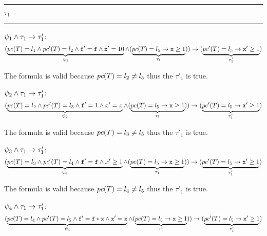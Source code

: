 \begin{center}\rule{4cm}{0.4pt}  $\tau_1$  \rule{4cm}{0.4pt}\end{center}
	
	 $\psi_1 \wedge \tau_1 \to \tau_1'$:
	\begin{equation*}
		(
			\underbrace{pc(T) = l_1 \wedge pc'(T) = l_2 \wedge \mathtt{f'=f} \wedge \mathtt{x}' = 10}_{\psi_1} \wedge (\underbrace{pc(T) = l_5 \to \mathtt{x}\geq 1}_{\tau_1})
		) 
				\to(\underbrace{pc'(T) = l_5 \to \mathtt{x}' \geq 1}_{\tau_1'})\\\\
	\end{equation*}


	The formula is valid because $pc(T) = l_2 \neq l_5$ thus the $\tau'_1$ is true.

	 $\psi_2 \wedge \tau_1 \to \tau_1'$:
	\begin{equation*}
		(
			\underbrace{pc(T) = l_2 \wedge pc'(T) = l_3 \wedge \mathtt{f}' = 1 \wedge x'=x}_{\psi_2} \wedge (\underbrace{pc(T) = l_5 \to \mathtt{x}\geq 1}_{\tau_1})
		) 
			\to(\underbrace{pc'(T) = l_5 \to \mathtt{x}' \geq 1}_{\tau_1'})\\\\
	\end{equation*}


	The formula is valid because $pc(T) = l_3 \neq l_5$ thus the $\tau'_1$ is true.

	 $\psi_3 \wedge \tau_1 \to \tau_1'$:
	\begin{equation*}
		(
			\underbrace{pc(T) = l_3 \wedge pc'(T) = l_4 \wedge \mathtt{f'=f} \wedge x'\geq 1}_{\psi_3} \wedge (\underbrace{pc(T) = l_5 \to \mathtt{x}\geq 1}_{\tau_1})
		) 
			\to(\underbrace{pc'(T) = l_5 \to \mathtt{x}' \geq 1}_{\tau_1'})\\\\
	\end{equation*}

		The formula is valid because $pc(T) = l_4 \neq l_5$ thus the $\tau'_1$ is true.

	 \;$\psi_4 \wedge \tau_1 \to \tau_1'$: 
	\begin{equation*}
		(
			\underbrace{pc(T) = l_4 \wedge pc'(T) = l_5 \wedge \mathtt{f}' = \mathtt{f*x} \wedge \mathtt{x'=x}}_{\psi_4} \wedge (\underbrace{pc(T) = l_5 \to \mathtt{x}\geq 1}_{\tau_1})
		) 
			\to(\underbrace{pc'(T) = l_5 \to \mathtt{x}' \geq 1}_{\tau_1'})\\\\
	\end{equation*}

